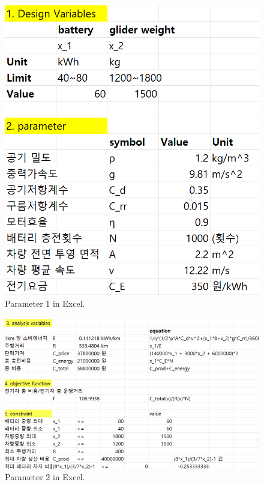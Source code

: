 \documentclass[11pt,twocolumn]{article}
\begin{document}
                \begin{figure}[h]
                        \centering
                        \includegraphics[width=.6\columnwidth]{Excel111.png}
                        \caption{Parameter 1 in Excel.}
                        \label{param1}
                \end{figure}
                \begin{figure}[h]
                        \centering
                        \includegraphics[width=.8\columnwidth]{Excel22.png}
                        \caption{Parameter 2 in Excel.}
                        \label{param2}
                \end{figure}
\end{document}
